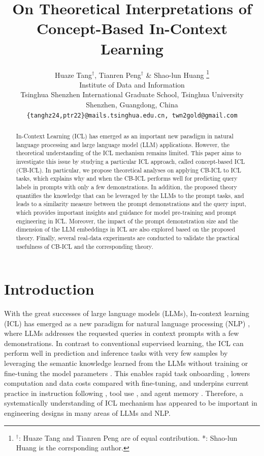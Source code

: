 \documentclass{article} %
\title{On Theoretical Interpretations of Concept-Based In-Context Learning}
\author{Huaze Tang$^\dagger$, Tianren Peng$^\dagger$ \& Shao-lun Huang \thanks{$^\dagger$: Huaze Tang and Tianren Peng are of equal contribution. *: Shao-lun Huang is the corrsponding author.} \\
Institute of Data and Information\\
Tsinghua Shenzhen International Graduate School, Tsinghua University\\
Shenzhen, Guangdong, China \\
\texttt{\{tanghz24,ptr22\}@mails.tsinghua.edu.cn, twn2gold@gmail.com}
}
\theoremstyle{plain} %
\begin{document}
\maketitle

\begin{abstract}
In-Context Learning (ICL) has emerged as an important new paradigm in natural language processing and large language model (LLM) applications. However, the theoretical understanding of the ICL mechanism remains limited. This paper aims to investigate this issue by studying a particular ICL approach, called concept-based ICL (CB-ICL). In particular, we propose theoretical analyses on applying CB-ICL to ICL tasks, which explains why and when the CB-ICL performs well for predicting query labels in prompts with only a few demonstrations. In addition, the proposed theory quantifies the knowledge that can be leveraged by the LLMs to the prompt tasks, and leads to a similarity measure between the prompt demonstrations and the query input, which provides important insights and guidance for model pre-training and prompt engineering in ICL. Moreover,  the impact of the prompt demonstration size and the dimension of the LLM embeddings in ICL are also explored based on the proposed theory. Finally, several real-data experiments are conducted to validate the practical usefulness of CB-ICL and the corresponding theory. 
\end{abstract} %

\maketitle

\section{Introduction}

With the great successes of large language models (LLMs), In-context learning (ICL) has emerged as a new paradigm for natural language processing (NLP) \citep{brown2020language,chowdhery2023palm,achiam2023gpt}, where LLMs addresses the requested queries in context prompts with a few demonstrations. In contrast to conventional supervised learning, the ICL can perform well in prediction and inference tasks with very few samples by leveraging the semantic knowledge learned from the LLMs without training or fine-tuning the model parameters \citep{liu2022makes,lu2022fantastically,wei2022chain,wu2023self}. This enables rapid task onboarding \citep{sun2022black}, lowers computation and data costs compared with fine-tuning, and underpins current practice in instruction following \citep{linunlocking}, tool use \citep{schick2023toolformer}, and agent memory \citep{chhikara2025mem0}. Therefore, a systematically understanding of ICL mechanism has appeared to be important in engineering designs in many areas of LLMs and NLP. 
\end{document}
